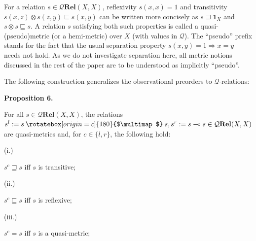 \documentclass[10pt,a4paper]{amsart}
\providecommand{\multimapinv}{\mathbin{\rotatebox[origin=c]{180}{$\multimap$}}}
\begin{document}
 
For a relation $s\in\mathcal{Q}\textbf{Rel}(X,X)$, reflexivity $s(x,x)=1$ and transitivity $s(x,z)\otimes s(z,y)\sqsubseteq s(x,y)$ can be written more concisely as $s\sqsupseteq\mathbf{1}_{X}$ and $s\otimes s\sqsubseteq s$. A relation $s$ satisfying both such properties is called a quasi-(pseudo)metric (or a hemi-metric) over $X$ (with values in $\mathcal{Q}$). The “pseudo” prefix stands for the fact that the usual separation property $s(x,y)=1\Rightarrow x=y$ needs not hold. As we do not investigate separation here, all metric notions discussed in the rest of the paper are to be understood as implicitly “pseudo”.\par
 
 
 
The following construction generalizes the observational preorders to $\mathcal{Q}$-relations:\par
 
 
 
\par\medskip\noindent\textbf{Proposition 6.}\par
 
 
For all $s\in\mathcal{Q}\mathbf{Rel}(X,X)$, the relations $s^{l}:=s\multimapinv s,s^{r}:=s\multimap s\in\mathcal{Q}\mathbf{Rel}(X,X)$ are quasi-metrics and, for $c\in\{l,r\}$, the following hold:\par
  
\par\noindent  (i.) 
 
$s^{c}\sqsupseteq s$ iff $s$ is transitive;\par
 
 
 
\par\noindent  (ii.) 
 
$s^{c}\sqsubseteq s$ iff $s$ is reflexive;\par
 
 
 
\par\noindent  (iii.) 
 
$s^{c}=s$ iff $s$ is a quasi-metric;\par
 
\end{document}
